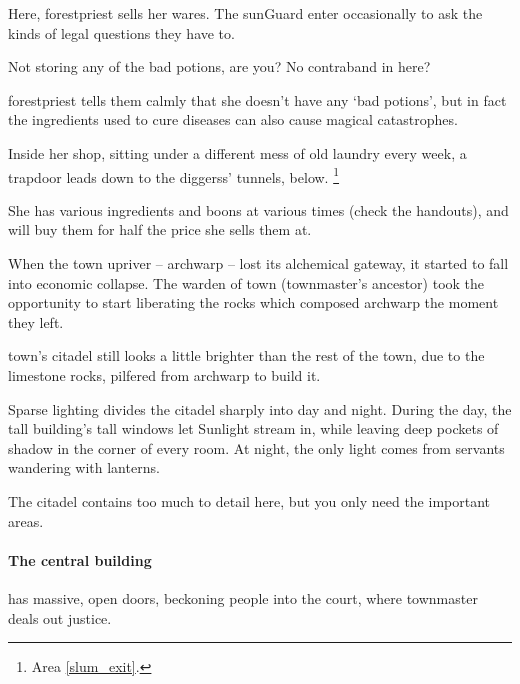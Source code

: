 \begin{multicols}{2}
Here, \gls{forestpriest} sells her wares.
The \gls{sunGuard} enter occasionally to ask the kinds of legal questions they have to.

\begin{speechtext}
  Not storing any of the bad potions, are you?
  No contraband in here?
\end{speechtext}

\Gls{forestpriest} tells them calmly that she doesn't have any `bad potions', but in fact the \glspl{ingredient} used to cure diseases can also cause magical catastrophes.

Inside her shop, sitting under a different mess of old laundry every week, a trapdoor leads down to the \glspl{diggers}' tunnels, below.%
\footnote{Area \vref{slum_exit}.}

She has various \glspl{ingredient} and \glspl{boon} at various times (check the handouts), and will buy them for half the price she sells them at.



\begin{exampletext}
  When the town upriver -- \gls{archwarp} -- lost its alchemical gateway, it started to fall into economic collapse.
  The \gls{warden} of \gls{town} (\gls{townmaster}'s ancestor) took the opportunity to start liberating the rocks which composed \gls{archwarp} the moment they left.

  \Gls{town}'s citadel still looks a little brighter than the rest of the town, due to the limestone rocks, pilfered from \gls{archwarp} to build it.
\end{exampletext}

Sparse lighting divides the citadel sharply into day and night.
During the day, the tall building's tall windows let Sunlight stream in, while leaving deep pockets of shadow in the corner of every room.
At night, the only light comes from servants wandering with lanterns.

The citadel contains too much to detail here, but you only need the important areas.

\paragraph{The central building}
has massive, open doors, beckoning people into the \gls{court}, where \gls{townmaster} deals out justice.


\end{multicols}
